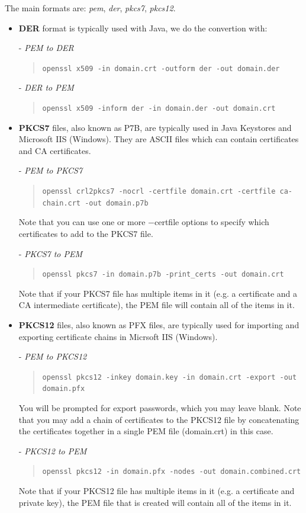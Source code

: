 \documentclass[11pt]{article}
\begin{document}
The main formats are: {\em pem}, {\em der}, {\em pkcs7}, {\em pkcs12}.
\begin{itemize}
  \item {\bf DER} format is typically used with Java, we do the convertion with:

  - {\em PEM to DER}
  \begin{quote}
    \texttt{openssl x509 -in domain.crt -outform der -out domain.der}
  \end{quote}

  - {\em DER to PEM}
  \begin{quote}
    \texttt{openssl x509 -inform der -in domain.der -out domain.crt}
  \end{quote}

  \item {\bf PKCS7} files, also known as P7B, are typically used in Java Keystores and Microsoft IIS (Windows). They are ASCII files which can contain certificates and CA certificates.

  - {\em PEM to PKCS7}
  \begin{quote}
    \texttt{openssl crl2pkcs7 -nocrl -certfile domain.crt -certfile ca-chain.crt -out domain.p7b}
  \end{quote}

  Note that you can use one or more $-$certfile options to specify which certificates to add to the PKCS7 file.

  - {\em PKCS7 to PEM}
  \begin{quote}
    \texttt{openssl pkcs7 -in domain.p7b -print\_certs -out domain.crt}
  \end{quote}

  Note that if your PKCS7 file has multiple items in it (e.g. a certificate and a CA intermediate certificate), the PEM file will contain all of the items in it.

\item {\bf PKCS12} files, also known as PFX files, are typically used for importing and exporting certificate chains in Micrsoft IIS (Windows).

- {\em PEM to PKCS12}
  \begin{quote}
    \texttt{openssl pkcs12 -inkey domain.key -in domain.crt -export -out domain.pfx}
  \end{quote}

  You will be prompted for export passwords, which you may leave blank. Note that you may add a chain of certificates to the PKCS12 file by concatenating the certificates together in a single PEM file (domain.crt) in this case.

  - {\em PKCS12 to PEM}
  \begin{quote}
    \texttt{openssl pkcs12 -in domain.pfx -nodes -out domain.combined.crt}
  \end{quote}

  Note that if your PKCS12 file has multiple items in it (e.g. a certificate and private key), the PEM file that is created will contain all of the items in it.
\end{itemize}
\end{document}
